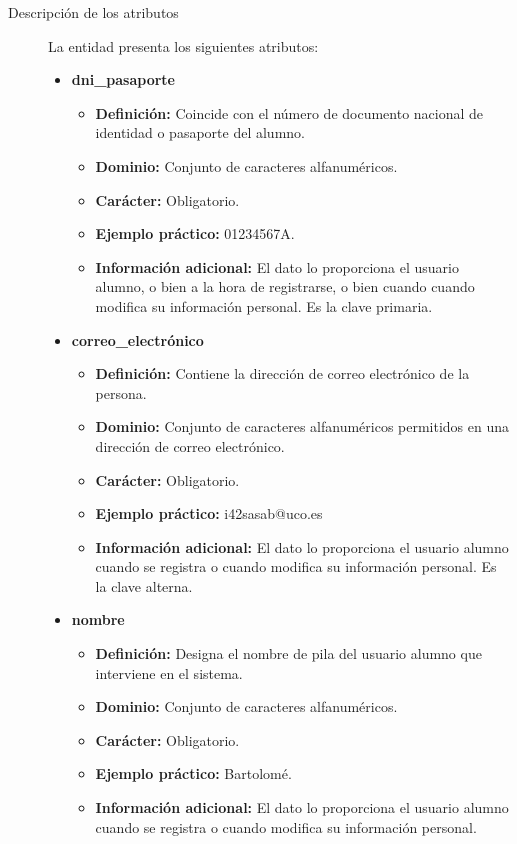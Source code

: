 \begin{description}
   \item[Descripción de los atributos] La entidad presenta los siguientes
   atributos:

   \begin{itemize}
   \item \textbf{dni\_pasaporte}
      \begin{itemize}
         \item \textbf{Definición:} Coincide con el número de documento nacional
         de identidad o pasaporte del alumno.
         \item \textbf{Dominio:} Conjunto de caracteres alfanuméricos.
         \item \textbf{Carácter:} Obligatorio.
         \item \textbf{Ejemplo práctico:} 01234567A.
         \item \textbf{Información adicional:} El dato lo proporciona el usuario alumno, o bien a la hora de registrarse, o bien cuando cuando modifica su información personal. Es la clave primaria.
      \end{itemize}
   \item \textbf{correo\_electrónico}
      \begin{itemize}
         \item \textbf{Definición:} Contiene la dirección de correo electrónico de la persona.
         \item \textbf{Dominio:} Conjunto de caracteres alfanuméricos permitidos en una dirección de correo electrónico.
         \item \textbf{Carácter:} Obligatorio.
         \item \textbf{Ejemplo práctico:} i42sasab@uco.es
         \item \textbf{Información adicional:} El dato lo proporciona el usuario alumno cuando se registra o cuando modifica su información personal. Es la clave alterna.
      \end{itemize}
   \item \textbf{nombre}
      \begin{itemize}
         \item \textbf{Definición:} Designa el nombre de pila del usuario alumno que interviene en el sistema.
         \item \textbf{Dominio:} Conjunto de caracteres alfanuméricos.
         \item \textbf{Carácter:} Obligatorio.
         \item \textbf{Ejemplo práctico:} Bartolomé.
         \item \textbf{Información adicional:} El dato lo proporciona el usuario alumno cuando se registra o cuando modifica su información personal.

\end{itemize}
\end{itemize}
\end{description}

